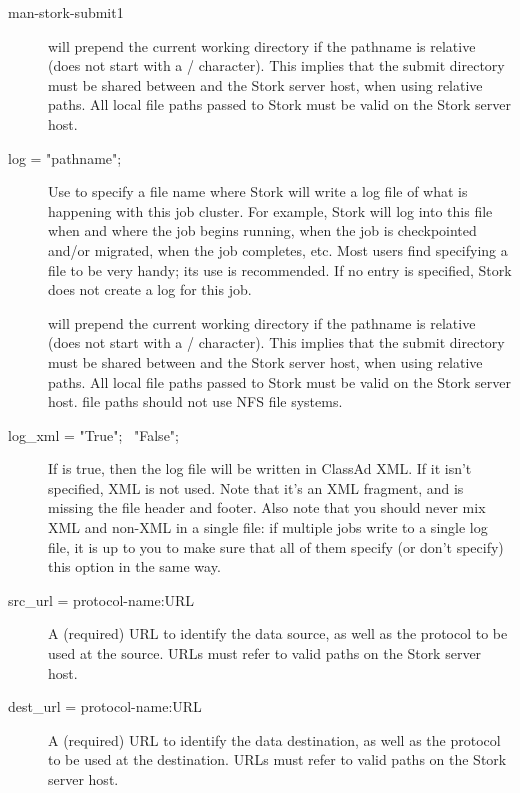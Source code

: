 \begin{ManPage}{}{man-stork-submit}{1}
\begin{description}
 will prepend the current working directory if the pathname is
relative (does not start with a / character).  This implies that the submit
directory must be shared between  and the Stork server host, when
using relative paths.  All local file paths passed to Stork must be valid on
the Stork server host.


\item[log = "\lt{}pathname\gt{}";]
Use  to specify a file name where
Stork will write a log file of what is happening with this job cluster.
For example, Stork will log into this file when and where the job
begins running, when the job is checkpointed and/or migrated, when the
job completes, etc. Most users find specifying a  file to be very
handy; its use is recommended. If no  entry is specified, 
Stork does not create a log for this job.

 will prepend the current working directory if the pathname is
relative (does not start with a / character).  This implies that the submit
directory must be shared between  and the Stork server host, when
using relative paths.  All local file paths passed to Stork must be valid on
the Stork server host.
 file paths should not use NFS file systems.

\item[log\_xml = "True"; \Bar{}\ "False";]
If  is true, 
then the log file will be written in ClassAd XML. If it isn't
specified, XML is not used. Note that it's an XML fragment, and is
missing the file header and footer. Also note that you should never
mix XML and non-XML in a single file: if multiple jobs write to a
single log file, it is up to you to make sure that all of them specify
(or don't specify) this option in the same way.
\item[src\_url = \lt{}protocol-name:URL\gt{}]
A (required) URL to identify the data source, 
as well as the protocol to be used at the source.
 URLs must refer to valid paths on the Stork server host.

\item[dest\_url = \lt{}protocol-name:URL\gt{}]
A (required) URL to identify the data destination, 
as well as the protocol to be used at the destination.
 URLs must refer to valid paths on the Stork server host.


\end{description}
\end{ManPage}
